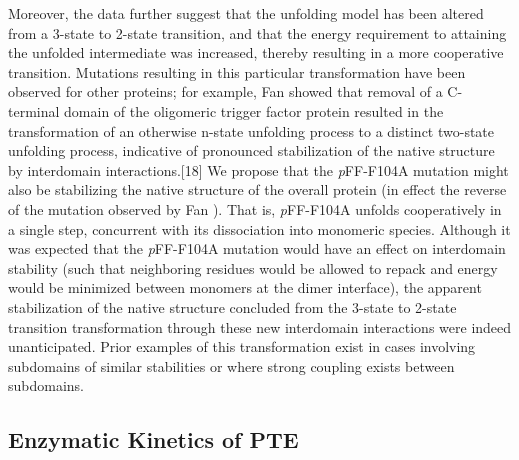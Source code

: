 \begin{refsection}
Moreover, the data further suggest that the unfolding model has been altered
from a 3-state to 2-state transition, and that the energy requirement to
attaining the unfolded intermediate was increased, thereby resulting in a more
cooperative transition. Mutations resulting in this particular transformation
have been observed for other proteins; for example, Fan  showed
that removal of a C-terminal domain of the oligomeric  trigger
factor protein resulted in the transformation of an otherwise n-state unfolding
process to a distinct two-state unfolding process, indicative of pronounced
stabilization of the native structure by interdomain interactions.[18] We
propose that the \emph{p}FF-F104A mutation might also be stabilizing the native
structure of the overall protein (in effect the reverse of the mutation
observed by Fan ).\cite{Fan2008} That is, \emph{p}FF-F104A unfolds
cooperatively in a single step, concurrent with its dissociation into monomeric
species. Although it was expected that the \emph{p}FF-F104A mutation would have an
effect on interdomain stability (such that neighboring residues would be
allowed to repack and energy would be minimized between monomers at the dimer
interface), the apparent stabilization of the native structure concluded from
the 3-state to 2-state transition transformation through these new interdomain
interactions were indeed unanticipated. Prior examples of this transformation
exist in cases involving subdomains of similar stabilities or where strong
coupling exists between subdomains.\cite{Tsytlonok2013}

\subsection{Enzymatic Kinetics of PTE}


\end{refsection}
